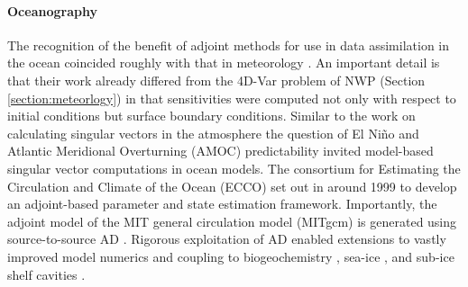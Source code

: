 \paragraph{Oceanography}

The recognition of the benefit of adjoint methods for use in data assimilation in the ocean coincided roughly with that in meteorology \cite{Thacker:1988kp,Thacker:1988ed,Thacker:1989jf,Tziperman.1989,Tziperman:1992hg,Tziperman:1992jw}. 
An important detail is that their work already differed from the 4D-Var problem of NWP (Section \ref{section:meteorlogy}) in that sensitivities were computed not only with respect to initial conditions but surface boundary conditions.
Similar to the work on calculating singular vectors in the atmosphere 
the question of El Ni\~no \cite{Moore.1997ah,Moore.1997}
and Atlantic Meridional Overturning (AMOC) \cite{Zanna.2010,Zanna:2011ge,Zanna:2012dw}
predictability invited model-based singular vector computations in ocean models. 
The consortium for Estimating the Circulation and Climate of the Ocean (ECCO) \cite{Stammer.2002} set out in around 1999 to develop an adjoint-based parameter and state estimation framework.
Importantly, the adjoint model of the MIT general circulation model (MITgcm) is generated using source-to-source AD \cite{Marotzke:1999, Heimbach.2005}. 
Rigorous exploitation of AD enabled extensions to vastly improved model numerics \cite{Forget.2015m9i} and coupling to biogeochemistry \cite{Dutkiewicz:2006gw}, sea-ice \cite{Heimbach:2010fz}, and sub-ice shelf cavities \cite{Heimbach:2012iu}.
